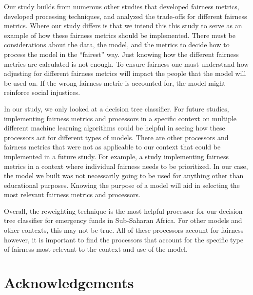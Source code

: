 \documentclass[water,article,submit,moreauthors,pdftex]{mdpi}
\begin{document}
Our study builds from numerous other studies that developed fairness
metrics\citep{speicher2018unified, wachter2021fairness}, developed
processing
techniques\citep{agarwal2018reductions, kamiran2012data, agarwal2019fair, pleiss2017fairness},
and analyzed the trade-offs for different fairness
metrics\citep{speicher2018unified}. Where our study differs is that we
intend this this study to serve as an example of how these fairness
metrics should be implemented. There must be considerations about the
data, the model, and the metrics to decide how to process the model in
the ``fairest'' way. Just knowing how the different fairness metrics are
calculated is not enough. To ensure fairness one must understand how
adjusting for different fairness metrics will impact the people that the
model will be used on. If the wrong fairness metric is accounted for,
the model might reinforce social injustices.

In our study, we only looked at a decision tree classifier. For future
studies, implementing fairness metrics and processors in a specific
context on multiple different machine learning algorithms could be
helpful in seeing how these processors act for different types of
models. There are other processors and fairness metrics that were not as
applicable to our context that could be implemented in a future study.
For example, a study implementing fairness metrics in a context where
individual fairness needs to be prioritized. In our case, the model we
built was not necessarily going to be used for anything other than
educational purposes. Knowing the purpose of a model will aid in
selecting the most relevant fairness metrics and processors.

Overall, the reweighting technique is the most helpful processor for our
decision tree classifier for emergency funds in Sub-Saharan Africa. For
other models and other contexts, this may not be true. All of these
processors account for fairness however, it is important to find the
processors that account for the specific type of fairness most relevant
to the context and use of the model.

\hypertarget{acknowledgements}{%
\section{Acknowledgements}\label{acknowledgements}}
\end{document}

